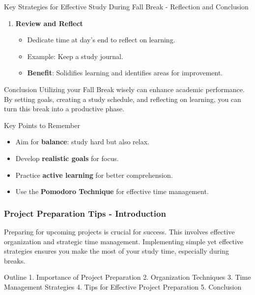 \documentclass[aspectratio=169]{beamer}
\begin{document}
\begin{frame}[fragile]{Key Strategies for Effective Study During Fall Break - Reflection and Conclusion}
  \begin{enumerate}
    \item \textbf{Review and Reflect}
      \begin{itemize}
        \item Dedicate time at day's end to reflect on learning.
        \item Example: Keep a study journal.
        \item \textbf{Benefit}: Solidifies learning and identifies areas for improvement.
      \end{itemize}
  \end{enumerate}
  
  \begin{block}{Conclusion}
    Utilizing your Fall Break wisely can enhance academic performance. By setting goals, creating a study schedule, and reflecting on learning, you can turn this break into a productive phase.
  \end{block}

  \begin{alertblock}{Key Points to Remember}
    \begin{itemize}
      \item Aim for \textbf{balance}: study hard but also relax.
      \item Develop \textbf{realistic goals} for focus.
      \item Practice \textbf{active learning} for better comprehension.
      \item Use the \textbf{Pomodoro Technique} for effective time management.
    \end{itemize}
  \end{alertblock}
\end{frame}

\begin{frame}[fragile]
    \frametitle{Project Preparation Tips - Introduction}
    Preparing for upcoming projects is crucial for success. This involves effective organization and strategic time management. 
    Implementing simple yet effective strategies ensures you make the most of your study time, especially during breaks.

    \begin{block}{Outline}
    1. Importance of Project Preparation
    2. Organization Techniques
    3. Time Management Strategies
    4. Tips for Effective Project Preparation
    5. Conclusion
    \end{block}
\end{frame}
\end{document}
